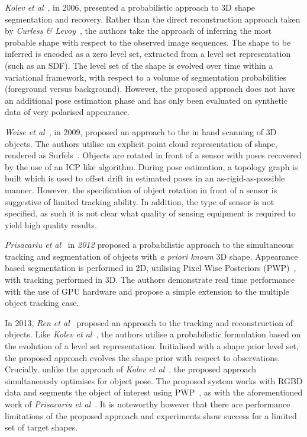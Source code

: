 \textit{Kolev et al}~\cite{Kolev2006}, in 2006, presented a probabilistic approach to 3D shape 
segmentation and recovery. Rather than the direct reconstruction approach taken by 
\textit{Curless \& Levoy}~\cite{Curless1996}, the authors take the approach of inferring the most 
probable shape with respect to the observed image sequences. The shape to be inferred is encoded as a 
zero level set, extracted from a level set representation (such as an SDF). The level set of the shape is 
evolved over time within a variational framework, with respect to a volume of segmentation 
probabilities (foreground versus background). However, the proposed approach does not have an additional pose 
estimation phase and has only been evaluated on synthetic data of very polarised appearance.

\textit{Weise et al}~\cite{Weise2009}, in 2009, proposed an approach to the in hand scanning of 3D objects. 
The authors utilise an explicit point cloud representation of shape, rendered as Surfels~\cite{Pfister2000}. 
Objects are rotated in front of a sensor with poses recovered by the use of an ICP like algorithm. During 
pose estimation, a topology graph is built which is used to offset drift in estimated poses in an 
as-rigid-as-possible~\cite{Igarashi2005} manner. However, the specification of object rotation in front of 
a sensor is suggestive of limited tracking ability. In addition, the type of sensor is not specified, 
as such it is not clear what quality of sensing equipment is required to yield high quality results.

\textit{Prisacariu et al}~\cite{Prisacariu2012} in \textit{2012} proposed a probabilistic approach to the 
simultaneous tracking and segmentation of objects with \textit{a priori known} 3D shape. Appearance based 
segmentation is performed in 2D, utilising Pixel Wise Posteriors (PWP)~\cite{Bibby2008}, with tracking performed 
in 3D. The authors demonstrate real time performance with the use of GPU hardware and propose a simple extension 
to the multiple object tracking case.

In 2013, \textit{Ren et al}~\cite{Ren2013} proposed an approach to the tracking and reconstruction of 
objects. Like \textit{Kolev et al}~\cite{Kolev2006}, the authors utilise a probabilistic formulation 
based on the evolution of a level set representation. Initialised with a shape prior level set, the 
proposed approach evolves the shape prior with respect to observations. Crucially, unlike the approach of 
\textit{Kolev et al}~\cite{Kolev2006}, the proposed approach simultaneously optimises for object pose.
The proposed system works with RGBD data and segments the object of interest using PWP~\cite{Bibby2008}, as 
with the aforementioned work of \textit{Prisacariu et al}~\cite{Prisacariu2012}. It is noteworthy however 
that there are performance limitations of the proposed approach and experiments show success for a limited 
set of target shapes.


